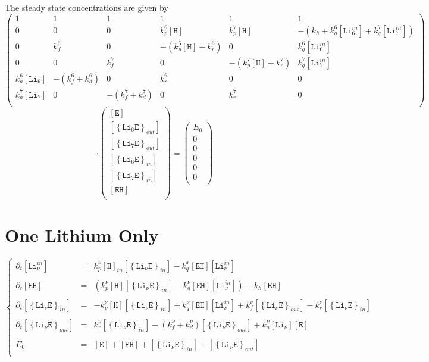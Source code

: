 \documentclass[aps,onecolumn,11pt]{revtex4}
\newcommand{\mychem}[1]{\mathtt{#1}}
\newcommand{\myconc}[1]{\left\lbrack{#1}\right\rbrack}
\newcommand{\LiEin}[1]{\myconc{\left\lbrace\mychem{Li}_{#1}\mychem{E}\right\rbrace_{in}}}
\newcommand{\LiEout}[1]{\myconc{\left\lbrace\mychem{Li}_{#1}\mychem{E}\right\rbrace_{out}}}
\newcommand{\LiIn}[1]{\myconc{\mychem{Li}_{#1}^{in}}}
\newcommand{\LiOut}[1]{\myconc{\mychem{Li}_{#1}}}
\newcommand{\EHin}{\myconc{\mychem{EH}}}
\newcommand{\Eout}{\myconc{\mychem{E}}}
\newcommand{\Hin}{\myconc{\mychem{H}}}
\begin{document}
The steady state concentrations are given by
\begin{equation}
\begin{pmatrix}
	1 & 1 & 1 &1 &1 &1 \\
	0 & 0 & 0 & k_p^6\Hin & k_p^7\Hin & -(k_h+k_q^6\LiIn{6}+k_q^7\LiIn{7}) \\
	0 & k_f^6 & 0 & -(k_p^6\Hin+k_r^6) & 0 & k_q^6\LiIn{6} \\
	0 & 0 & k_f^7 & 0 & -(k_p^7\Hin+k_r^7) & k_q^7\LiIn{7} \\
	k_a^6\LiOut{6} & -(k_f^6+k_d^6) & 0 & k_r^6 & 0 & 0 \\
	k_a^7\LiOut{7} & 0 & -(k_f^7+k_d^7) & 0 & k_r^7 & 0 \\
\end{pmatrix}
\end{equation}
\begin{equation}
\cdot
	\begin{pmatrix}
	\Eout\\
	\LiEout{6}\\
	\LiEout{7}\\
	\LiEin{6}\\
	\LiEin{7}\\
	\EHin\\
	\end{pmatrix}
	=
	\begin{pmatrix}
	E_0\\
	0\\
	0\\
	0\\
	0\\
	0\\
	\end{pmatrix}
\end{equation}

\section{One Lithium Only}
\begin{equation}
\displaystyle
\left\lbrace
\begin{array}{rcl}
\partial_t\LiIn{\nu}   & = & k_p^\nu \myconc{\mychem{H}}_{in} \LiEin{\nu} - k_q^x \EHin \LiIn{\nu} \\
\\
\partial_t \EHin     & = & \left( k_p^\nu \Hin \LiEin{\nu} - k_q^\nu \EHin \LiIn{\nu}\right) - k_h \EHin \\
\\
\partial_t \LiEin{\nu} & = & -k_p^\nu \Hin \LiEin{\nu} + k_q^\nu \EHin \LiIn{\nu}
+ k_f^\nu \LiEout{\nu} - k_r^\nu \LiEin{\nu}\\
\\
\partial_t \LiEout{\nu} & = & k_r^\nu \LiEin{\nu} - (k_f^\nu+k_d^\nu) \LiEout{\nu} + k_a^\nu \LiOut{\nu} \Eout \\
\\
E_0 & = & \Eout + \EHin + \LiEin{\nu} + \LiEout{\nu}\\
\end{array}
\right.
\end{equation}
\end{document}
